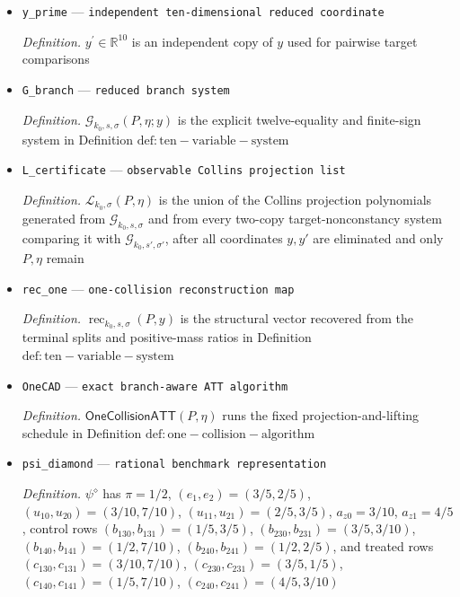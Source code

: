 \documentclass{article}
\begin{document}
\begin{itemize}
  \item \texttt{y\_\allowbreak{}prime} --- \texttt{independent ten-\allowbreak{}dimensional reduced coordinate}
  \par\smallskip\noindent\emph{Definition.} \(y^{\prime}\in\mathbb R^{10}\) is an independent copy of \(y\) used for pairwise target comparisons
  \item \texttt{G\_\allowbreak{}branch} --- \texttt{reduced branch system}
  \par\smallskip\noindent\emph{Definition.} \(\mathscr G_{k_0,s,\sigma}(P,\eta;y)\) is the explicit twelve-equality and finite-sign system in Definition \(\mathrm{def:ten-variable-system}\)
  \item \texttt{L\_\allowbreak{}certificate} --- \texttt{observable Collins projection list}
  \par\smallskip\noindent\emph{Definition.} \(\mathscr L_{k_0,\sigma}(P,\eta)\) is the union of the Collins projection polynomials generated from \(\mathscr G_{k_0,s,\sigma}\) and from every two-copy target-nonconstancy system comparing it with \(\mathscr G_{k_0,s',\sigma'}\), after all coordinates \(y,y'\) are eliminated and only \(P,\eta\) remain
  \item \texttt{rec\_\allowbreak{}one} --- \texttt{one-\allowbreak{}collision reconstruction map}
  \par\smallskip\noindent\emph{Definition.} \(\operatorname{rec}_{k_0,s,\sigma}(P,y)\) is the structural vector recovered from the terminal splits and positive-mass ratios in Definition \(\mathrm{def:ten-variable-system}\)
  \item \texttt{OneCAD} --- \texttt{exact branch-\allowbreak{}aware ATT algorithm}
  \par\smallskip\noindent\emph{Definition.} \(\mathsf{OneCollisionATT}(P,\eta)\) runs the fixed projection-and-lifting schedule in Definition \(\mathrm{def:one-collision-algorithm}\)
  \item \texttt{psi\_\allowbreak{}diamond} --- \texttt{rational benchmark representation}
  \par\smallskip\noindent\emph{Definition.} \(\psi^{\diamond}\) has \(\pi=1/2\), \((e_1,e_2)=(3/5,2/5)\), \((u_{10},u_{20})=(3/10,7/10)\), \((u_{11},u_{21})=(2/5,3/5)\), \(a_{z0}=3/10\), \(a_{z1}=4/5\), control rows \((b_{130},b_{131})=(1/5,3/5)\), \((b_{230},b_{231})=(3/5,3/10)\), \((b_{140},b_{141})=(1/2,7/10)\), \((b_{240},b_{241})=(1/2,2/5)\), and treated rows \((c_{130},c_{131})=(3/10,7/10)\), \((c_{230},c_{231})=(3/5,1/5)\), \((c_{140},c_{141})=(1/5,7/10)\), \((c_{240},c_{241})=(4/5,3/10)\)

\end{itemize}
\end{document}
